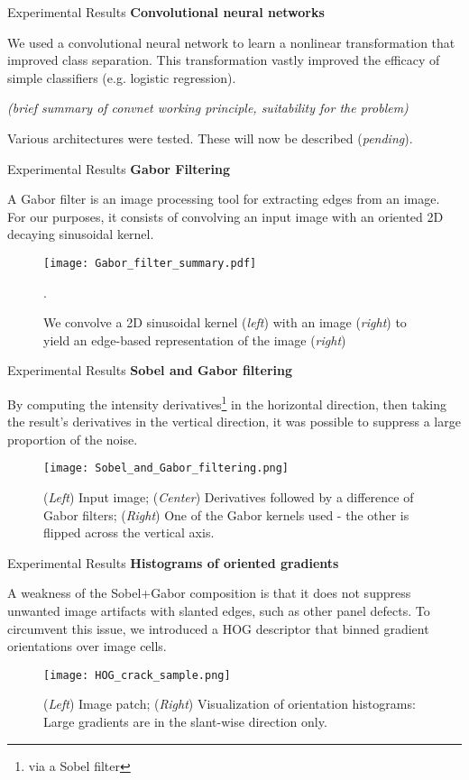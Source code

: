 \documentclass[10pt]{beamer}
\begin{document}
\begin{frame}{Experimental Results}
	\textbf{Convolutional neural networks}

	We used a convolutional neural network to learn a nonlinear transformation that improved class separation. This transformation vastly improved the efficacy of simple classifiers (e.g. logistic regression).
	
	\emph{(brief summary of convnet working principle, suitability for the problem)}
	
	Various architectures were tested. These will now be described (\emph{pending}).
\end{frame}


\begin{frame}{Experimental Results}
\textbf{Gabor Filtering}

A Gabor filter is an image processing tool for extracting edges from an image. For our purposes, it consists of convolving an input image with an oriented 2D decaying sinusoidal kernel.

	\begin{figure}
		\texttt{[image: Gabor\_filter\_summary.pdf]}
		\caption{We convolve a 2D sinusoidal kernel (\emph{left}) with an image (\emph{right}) to yield an edge-based representation of the image (\emph{right})}. 
	\end{figure}	

\end{frame}

\begin{frame}{Experimental Results}
\textbf{Sobel and Gabor filtering}

By computing the intensity derivatives\footnote{via a Sobel filter} in the horizontal direction, then taking the result's derivatives in the vertical direction, it was possible to suppress a large proportion of the noise.

\begin{figure}
	\texttt{[image: Sobel\_and\_Gabor\_filtering.png]}
	\caption{(\emph{Left}) Input image; (\emph{Center}) Derivatives followed by a difference of Gabor filters; (\emph{Right}) One of the Gabor kernels used - the other is flipped across the vertical axis.}
\end{figure}

\end{frame}


\begin{frame}{Experimental Results}
\textbf{Histograms of oriented gradients}

A weakness of the Sobel+Gabor composition is that it does not suppress unwanted image artifacts with slanted edges, such as other panel defects. To circumvent this issue, we introduced a HOG descriptor that binned gradient orientations over image cells.

\begin{figure}
	\texttt{[image: HOG\_crack\_sample.png]}
	\caption{(\emph{Left}) Image patch; (\emph{Right}) Visualization of orientation histograms: Large gradients are in the slant-wise direction only.}
\end{figure}

\end{frame}
\end{document}
